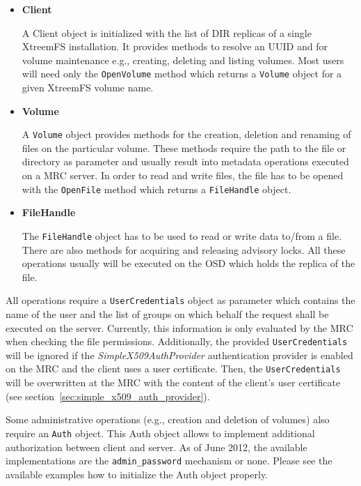 \documentclass[a4paper,10pt]{book}
\begin{document}
\begin{itemize}
 \item \textbf{Client}

A Client object is initialized with the list of DIR replicas of a single XtreemFS installation.
It provides methods to resolve an UUID and for volume maintenance e.g., creating, deleting and listing volumes.
Most users will need only the \texttt{OpenVolume} method which returns a \texttt{Volume} object for a given XtreemFS volume name.

 \item \textbf{Volume}

A \texttt{Volume} object provides methods for the creation, deletion and renaming of files on the particular volume. These methods require the path to the file or directory as parameter and usually result into metadata operations executed on a MRC server. In order to read and write files, the file has to be opened with the \texttt{OpenFile} method which returns a \texttt{FileHandle} object.

 \item \textbf{FileHandle}

The \texttt{FileHandle} object has to be used to read or write data to/from a file. There are also methods for acquiring and releasing advisory locks. All these operations usually will be executed on the OSD which holds the replica of the file.

\end{itemize}

All operations require a \texttt{UserCredentials} object as parameter which contains the name of the user and the list of groups on which behalf the request shall be executed on the server. Currently, this information is only evaluated by the MRC when checking the file permissions. Additionally, the provided \texttt{UserCredentials} will be ignored if the \emph{SimpleX509AuthProvider} authentication provider is enabled on the MRC and the client uses a user certificate. Then, the \texttt{UserCredentials} will be overwritten at the MRC with the content of the client's user certificate (see section~\ref{sec:simple_x509_auth_provider}).

Some administrative operations (e.g., creation and deletion of volumes) also require an \texttt{Auth} object. This Auth object allows to implement additional authorization between client and server. As of June 2012, the available implementations are the \texttt{admin\_password} mechanism or none. Please see the available examples how to initialize the Auth object properly.
\end{document}
